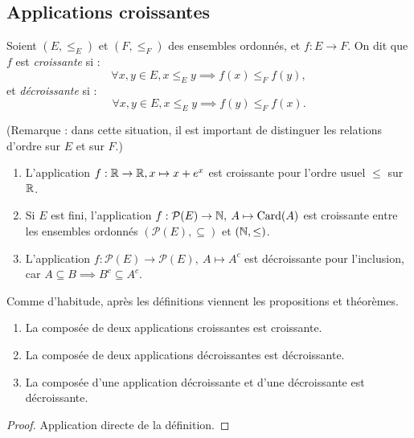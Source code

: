 \subsection{Applications croissantes}


\begin{definition}
Soient $(E,\leq_E)$ et $(F,\leq_F)$ des ensembles ordonnés, et $f : E\to F$. On dit que $f$ est \emph{croissante} si :
\[ \forall x, y\in E, x\leq_E y \implies f(x) \leq_F f(y),\]
et \emph{décroissante} si :
\[\forall x, y\in E, x\leq_E y \implies f(y) \leq_F f(x).\]
\end{definition}

(Remarque : dans cette situation, il est important de distinguer les relations d'ordre sur $E$ et sur $F$.)

\begin{exemple}
\begin{enumerate}
\item L'application $f : \mathbb{R}\to \mathbb{R}, x\mapsto x+e^x$ est croissante pour l'ordre usuel $\leq $ sur $\mathbb{R}$.
\item Si $E$ est fini, l'application $f : \mathcal P(E) \to \mathbb{N}, \: A\mapsto \operatorname{Card}(A)$ est croissante entre les ensembles ordonnés $(\mathcal P(E), \subseteq)$ et $(\mathbb{N}, \leq)$.
\item L'application $f : \mathcal P(E) \to \mathcal P(E), \: A\mapsto A^c$ est décroissante pour l'inclusion, car $A\subseteq B \implies B^c\subseteq A^c$.
\end{enumerate}
\end{exemple}

Comme d'habitude, après les définitions viennent les propositions et théorèmes.

\begin{proposition}
\begin{enumerate}
\item La composée de deux applications croissantes est croissante.
\item La composée de deux applications décroissantes est décroissante.
\item La composée d'une application décroissante et d'une décroissante est décroissante.
\end{enumerate}
\end{proposition}

\begin{proof}
Application directe de la définition.
\end{proof}

